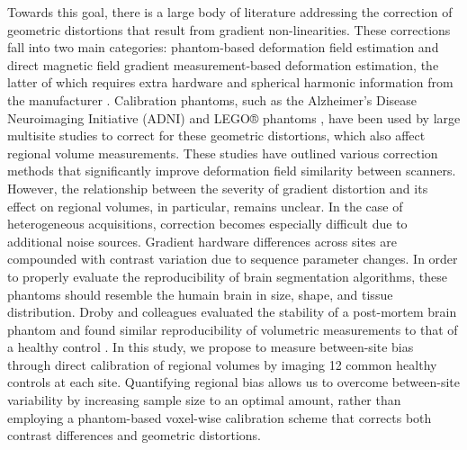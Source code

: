 Towards this goal, there is a large body of literature addressing the correction of geometric distortions that result from gradient non-linearities. These corrections fall into two main categories: phantom-based deformation field estimation and direct magnetic field gradient measurement-based deformation estimation, the latter of which requires extra hardware and spherical harmonic information from the manufacturer \cite{fonov2010improved}. Calibration phantoms, such as the Alzheimer's Disease Neuroimaging Initiative (ADNI) \cite{gunter2009measurement} and LEGO® phantoms \cite{caramanos2010gradient}, have been used by large multisite studies to correct for these geometric distortions, which also affect regional volume measurements. These studies have outlined various correction methods that significantly improve deformation field similarity between scanners. However, the relationship between the severity of gradient distortion and its effect on regional volumes, in particular, remains unclear. In the case of heterogeneous acquisitions, correction becomes especially difficult due to additional noise sources. Gradient hardware differences across sites are compounded with contrast variation due to sequence parameter changes. In order to properly evaluate the reproducibility of brain segmentation algorithms, these phantoms should resemble the humain brain in size, shape, and tissue distribution. Droby and colleagues evaluated the stability of a post-mortem brain phantom and found similar reproducibility of volumetric measurements to that of a healthy control \cite{droby2015human}. In this study, we propose to measure between-site bias through direct calibration of regional volumes by imaging 12 common healthy controls at each site. Quantifying regional bias allows us to overcome between-site variability by increasing sample size to an optimal amount, rather than employing a phantom-based voxel-wise calibration scheme that corrects both contrast differences and geometric distortions. 